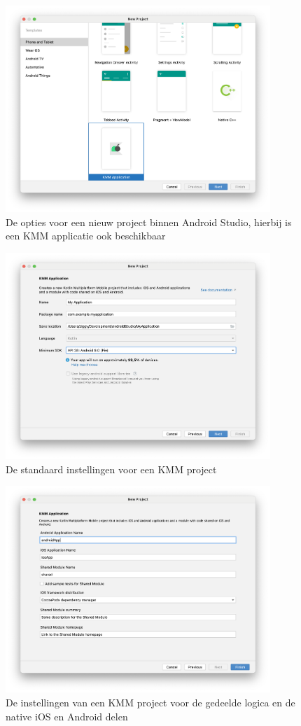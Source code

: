     \begin{figure}
        \centering
        \includegraphics[width=10cm]{img/kmm-plugin-1.png}
        \caption{De opties voor een nieuw project binnen Android Studio, hierbij is een KMM applicatie ook beschikbaar}
        \label{fig:M-kmm-plugin-1}
    \end{figure}
    \begin{figure}
        \centering
        \includegraphics[width=10cm]{img/kmm-plugin-2.png}
        \caption{De standaard instellingen voor een KMM project}
        \label{fig:M-kmm-plugin-2}
    \end{figure}
    \begin{figure}
        \centering
        \includegraphics[width=10cm]{img/kmm-plugin-3.png}
        \caption{De instellingen van een KMM project voor de gedeelde logica en de native iOS en Android delen}
        \label{fig:M-kmm-plugin-3}
    \end{figure}

